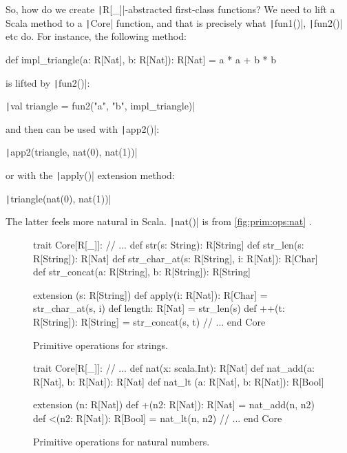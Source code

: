 \documentclass[11pt]{article}
\renewcommand{\vref}[1]{\autoref{#1} \vpageref{#1}}{}
\newcommand{\ScalaI}[1]{\texttt|#1|}
\begin{document}
So, how do we create \ScalaI{R[_]}-abstracted first-class functions? We need 
to lift a Scala method to a \ScalaI{Core} function, and that is precisely 
what \ScalaI{fun1()}, \ScalaI{fun2()} etc do. For instance, the following 
method:

\begin{ScalaBlockSimple}
def impl_triangle(a: R[Nat], b: R[Nat]): R[Nat] =
  a * a + b * b
\end{ScalaBlockSimple}

\noindent is lifted by \ScalaI{fun2()}:

\ScalaI{val triangle = fun2("a", "b", impl_triangle)}

\noindent and then can be used with \ScalaI{app2()}:

\ScalaI{app2(triangle, nat(0), nat(1))}

\noindent or with the \ScalaI{apply()} extension method:

\ScalaI{triangle(nat(0), nat(1))}

\noindent The latter feels more natural in Scala. \ScalaI{nat()} is from \vref{fig:prim:ops:nat}.

\begin{figure}[t]
\begin{ScalaBlock}
trait Core[R[_]]:
  // ...
  def str(s: String): R[String]
  def str_len(s: R[String]): R[Nat]
  def str_char_at(s: R[String], i: R[Nat]): R[Char]
  def str_concat(a: R[String], b: R[String]): R[String]
  
  extension (s: R[String])
    def apply(i: R[Nat]): R[Char] = str_char_at(s, i)
    def length: R[Nat] = str_len(s)
    def ++(t: R[String]): R[String] = str_concat(s, t)
  // ...
end Core
\end{ScalaBlock}
\caption{Primitive operations for strings.}
\label{fig:prim:ops:str}
\hrulefill
\end{figure}

\begin{figure}[tb]
\begin{ScalaBlock}
trait Core[R[_]]:
  // ...
  def nat(x: scala.Int): R[Nat]
  def nat_add(a: R[Nat], b: R[Nat]): R[Nat]
  def nat_lt (a: R[Nat], b: R[Nat]): R[Bool]
  
  extension (n: R[Nat])
    def +(n2: R[Nat]): R[Nat] = nat_add(n, n2)
    def <(n2: R[Nat]): R[Bool] = nat_lt(n, n2)
  // ...
end Core
\end{ScalaBlock}
\caption{Primitive operations for natural numbers.}
\label{fig:prim:ops:nat}
\hrulefill
\end{figure}
\end{document}
